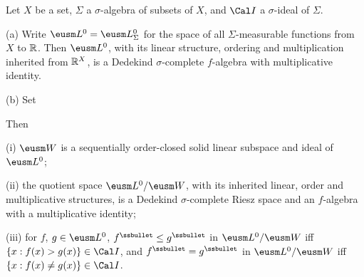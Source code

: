 Let $X$ be a set, $\Sigma$ a
$\sigma$-algebra of subsets of $X$, and $\Cal I$ a $\sigma$-ideal of
$\Sigma$.

(a) Write $\eusm L^0=\eusm L^0_{\Sigma}$ for the space of all
$\Sigma$-measurable functions from $X$ to $\Bbb R$.   Then
$\eusm L^0$, with its linear structure, ordering and multiplication
inherited from $\Bbb R^X$, is a Dedekind
$\sigma$-complete $f$-algebra with multiplicative identity.

(b) Set


\noindent Then

\quad (i) $\eusm W$ is a sequentially order-closed solid linear subspace
and ideal of $\eusm L^0$;

\quad (ii) the quotient space $\eusm L^0/\eusm W$, with its inherited
linear, order and multiplicative structures, is a Dedekind
$\sigma$-complete Riesz space and an $f$-algebra with a multiplicative
identity;

\quad (iii) for $f$, $g\in\eusm L^0$,
$f^{\ssbullet}\le g^{\ssbullet}$ in $\eusm L^0/\eusm W$ iff
$\{x:f(x)>g(x)\}\in\Cal I$,
and $f^{\ssbullet}=g^{\ssbullet}$ in $\eusm L^0/\eusm W$ iff
$\{x:f(x)\ne g(x)\}\in\Cal I$.

